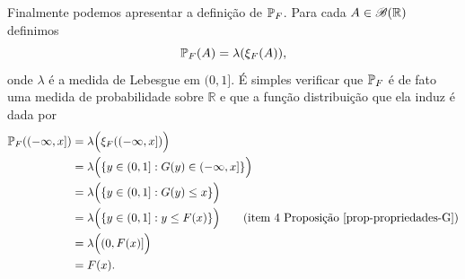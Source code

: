 Finalmente podemos apresentar a definição de $\P_F$.
Para cada $A\in \mathscr{B}(\R)$ definimos 
	\[
		\P_{F}(A) =\lambda(\xi_{F}(A)),
	\]
onde $\lambda$ é a medida de Lebesgue em $(0,1]$.
É simples verificar que $\P_F$ é de fato uma medida
de probabilidade sobre $\mathbb{R}$ 
e que a função distribuição que ela induz é dada por
%
\begin{align*}
	\P_F((-\infty,x]) 
	&=
	\lambda \Big(\xi_{F}((-\infty,x])\Big)
	\\
	&=
	\lambda\Big( \{ y\in (0,1]: G(y)\in (-\infty,x] \} \Big)
	\\
	&=
	\lambda\Big( \{ y\in (0,1]: G(y)\leq x \} \Big)
	\\
	&=
	\lambda\Big( \{ y\in (0,1]: y\leq F(x) \} \Big)
	\qquad
	(\text{item 4 Proposição \ref{prop-propriedades-G}})
	\\
	&=
	\lambda\Big( (0,F(x)] \Big)
	\\
	&=
	F(x).
\end{align*}














